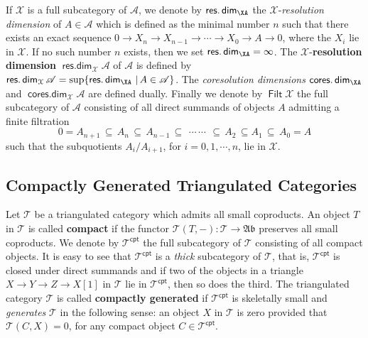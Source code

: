 \documentclass[oneside, a4paper,reqno]{amsart}
\numberwithin{equation}{section}
\theoremstyle{definition}
\begin{document}
If ${\mathcal X}$ is a full subcategory of ${\mathscr A}$, we denote by $\operatorname*{\mathsf{res.dim}}_\XA$ the
${\mathcal X}$-{\em resolution dimension} of $A \in{\mathscr A}$ which is defined as the
minimal number $n$ such that there exists an exact sequence $0 {\longrightarrow}
X_{n} {\longrightarrow} X_{n-1} {\longrightarrow} \cdots {\longrightarrow} X_{0} {\longrightarrow} A {\longrightarrow} 0$, where the
$X_{i}$ lie in ${\mathcal X}$. If no such number $n$ exists, then we set
$\operatorname*{\mathsf{res.dim}}_\XA = \infty$. The ${\mathcal X}$-{\bf resolution dimension}
$\operatorname*{\mathsf{res.dim}}_{\mathcal X}{\mathscr A}$ of ${\mathscr A}$ is defined by $\operatorname*{\mathsf{res.dim}}_{\mathcal X}{\mathscr A} = \sup\{\operatorname*{\mathsf{res.dim}}_\XA\, |
\, A\in {\mathscr A}\}$. The {\em coresolution dimensions} $\operatorname*{\mathsf{cores.dim}}_\XA$ and
$\operatorname*{\mathsf{cores.dim}}_{\mathcal X}{\mathscr A}$ are defined dually. Finally we denote by $\operatorname*{\mathsf{Filt}}{\mathcal X}$ the
full subcategory of ${\mathscr A}$ consisting of all direct summands of
objects $A$ admitting  a finite filtration
\begin{equation}
 0 = A_{n+1}\, \subseteq\, A_{n} \, \subseteq\, A_{n-1}\, \subseteq \,\
 \cdots \,
 \cdots \,\
 \subseteq \, A_{2}\, \subseteq A_{1} \, \subseteq\, A_{0} = A
\end{equation}
such that the subquotients $A_{i}/A_{i+1}$, for $i = 0,1,\cdots,n$,
lie in ${\mathcal X}$.

\subsection{Compactly Generated Triangulated Categories} Let ${\mathcal T}$ be
a triangulated category which admits all small coproducts. An object
$T$ in ${\mathcal T}$ is called {\bf compact} if the functor ${\mathcal T}(T,-) \colon
{\mathcal T} {\longrightarrow} {\mathfrak{Ab}}$ preserves all small coproducts. We denote by
${\mathcal T}^{\mathsf{cpt}}$ the full subcategory of ${\mathcal T}$ consisting of all compact
objects. It is easy to see that ${\mathcal T}^{\mathsf{cpt}}$ is a {\em thick}
subcategory of ${\mathcal T}$, that is, ${\mathcal T}^{\mathsf{cpt}}$ is closed under direct
summands and if two of the objects in a triangle $X {\longrightarrow} Y {\longrightarrow} Z
{\longrightarrow} X[1]$ in ${\mathcal T}$ lie in ${\mathcal T}^{\mathsf{cpt}}$, then so does the third. The
triangulated category ${\mathcal T}$ is called {\bf compactly generated} if
${\mathcal T}^{\mathsf{cpt}}$ is skeletally small and {\em generates} ${\mathcal T}$ in the
following sense: an object $X$ in ${\mathcal T}$ is zero provided that
${\mathcal T}(C,X) = 0$, for any compact object $C \in {\mathcal T}^{\mathsf{cpt}}$.
\end{document}
